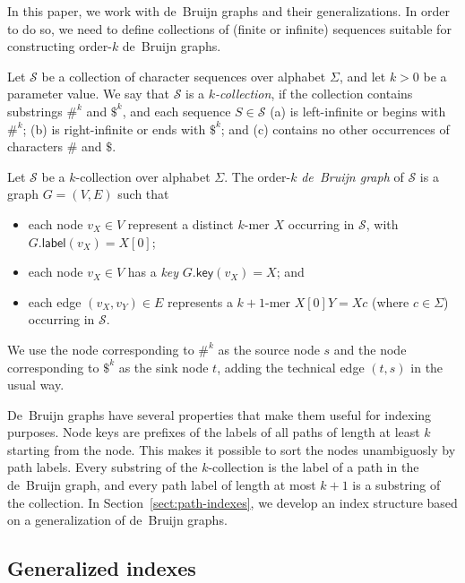 \documentclass[a4paper,UKenglish]{lipics-v2016}
\newcommand{\glabel}{\ensuremath{\mathsf{label}}}
\newcommand{\gkey}{\ensuremath{\mathsf{key}}}
\newcommand{\kmer}[1]{$#1$\nobreakdash-mer}
\newcommand{\kcollection}[1]{$#1$\nobreakdash-collection}
\newcommand{\orderk}[1]{order\nobreakdash-$#1$}
\begin{document}
In this paper, we work with de~Bruijn graphs and their generalizations. In order to do so, we need to define collections of (finite or infinite) sequences suitable for constructing \orderk{k} de~Bruijn graphs.

\begin{definition}[\kcollection{k}]
Let $\mathcal{S}$ be a collection of character sequences over alphabet $\Sigma$, and let $k > 0$ be a parameter value. We say that $\mathcal{S}$ is a \emph{\kcollection{k}}, if the collection contains substrings $\#^{k}$ and $\$^{k}$, and each sequence $S \in \mathcal{S}$
(a) is left-infinite or begins with $\#^{k}$;
(b) is right-infinite or ends with $\$^{k}$; and
(c) contains no other occurrences of characters $\#$ and $\$$.
\end{definition}

\begin{definition}
Let $\mathcal{S}$ be a \kcollection{k} over alphabet $\Sigma$. The \orderk{k} \emph{de~Bruijn graph} of $\mathcal{S}$ is a graph $G = (V, E)$ such that
\begin{itemize}
\item each node $v_{X} \in V$ represent a distinct \kmer{k} $X$ occurring in $\mathcal{S}$, with $G.\glabel(v_{X}) = X[0]$;
\item each node $v_{X} \in V$ has a \emph{key} $G.\gkey(v_{X}) = X$; and
\item each edge $(v_{X}, v_{Y}) \in E$ represents a \kmer{k+1} $X[0]Y = Xc$ (where $c \in \Sigma$) occurring in $\mathcal{S}$.
\end{itemize}
We use the node corresponding to $\#^{k}$ as the source node $s$ and the node corresponding to $\$^{k}$ as the sink node $t$, adding the technical edge $(t, s)$ in the usual way.
\end{definition}

De~Bruijn graphs have several properties that make them useful for indexing purposes. Node keys are prefixes of the labels of all paths of length at least $k$ starting from the node. This makes it possible to sort the nodes unambiguosly by path labels. Every substring of the \kcollection{k} is the label of a path in the de~Bruijn graph, and every path label of length at most $k+1$ is a substring of the collection. In Section~\ref{sect:path-indexes}, we develop an index structure based on a generalization of de~Bruijn graphs.

\subsection{Generalized indexes}
\end{document}
